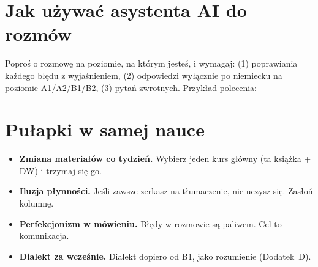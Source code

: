 \section*{Jak używać asystenta AI do rozmów}

Poproś o rozmowę na poziomie, na którym jesteś, i wymagaj: (1) poprawiania każdego błędu
z wyjaśnieniem, (2) odpowiedzi wyłącznie po niemiecku na poziomie A1/A2/B1/B2, (3) pytań
zwrotnych. Przykład polecenia:

\begin{uwaga}
\end{uwaga}

\section*{Pułapki w samej nauce}

\begin{itemize}
\item \textbf{Zmiana materiałów co tydzień.} Wybierz jeden kurs główny (ta książka + DW) i trzymaj się go.
\item \textbf{Iluzja płynności.} Jeśli zawsze zerkasz na tłumaczenie, nie uczysz się. Zasłoń kolumnę.
\item \textbf{Perfekcjonizm w mówieniu.} Błędy w rozmowie są paliwem. Cel to komunikacja.
\item \textbf{Dialekt za wcześnie.} Dialekt dopiero od B1, jako rozumienie (Dodatek~D).
\end{itemize}
